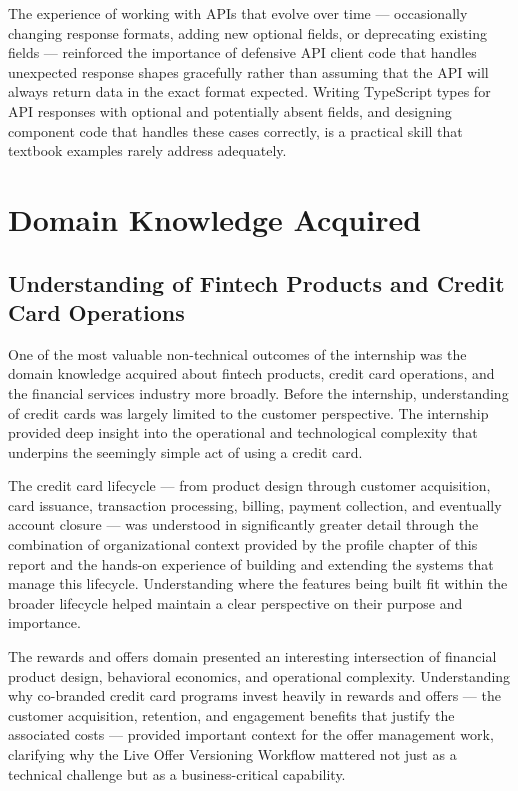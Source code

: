 The experience of working with APIs that evolve over time — occasionally changing response formats, adding new optional fields, or deprecating existing fields — reinforced the importance of defensive API client code that handles unexpected response shapes gracefully rather than assuming that the API will always return data in the exact format expected. Writing TypeScript types for API responses with optional and potentially absent fields, and designing component code that handles these cases correctly, is a practical skill that textbook examples rarely address adequately.

\section{Domain Knowledge Acquired}

\subsection{Understanding of Fintech Products and Credit Card Operations}

One of the most valuable non-technical outcomes of the internship was the domain knowledge acquired about fintech products, credit card operations, and the financial services industry more broadly. Before the internship, understanding of credit cards was largely limited to the customer perspective. The internship provided deep insight into the operational and technological complexity that underpins the seemingly simple act of using a credit card.

The credit card lifecycle — from product design through customer acquisition, card issuance, transaction processing, billing, payment collection, and eventually account closure — was understood in significantly greater detail through the combination of organizational context provided by the profile chapter of this report and the hands-on experience of building and extending the systems that manage this lifecycle. Understanding where the features being built fit within the broader lifecycle helped maintain a clear perspective on their purpose and importance.

The rewards and offers domain presented an interesting intersection of financial product design, behavioral economics, and operational complexity. Understanding why co-branded credit card programs invest heavily in rewards and offers — the customer acquisition, retention, and engagement benefits that justify the associated costs — provided important context for the offer management work, clarifying why the Live Offer Versioning Workflow mattered not just as a technical challenge but as a business-critical capability.

